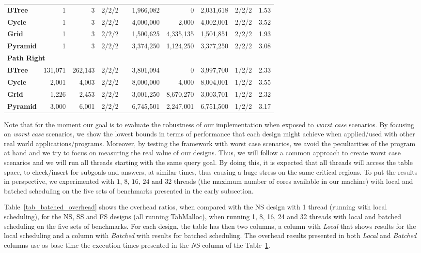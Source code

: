 \documentclass{llncs}
\begin{document}
\begin{table}[ht]
{\begin{tabular}{lrrccrrrcc}
\bf{BTree}    &       1 &       3 & 2/2/2 && 1,966,082 &         0 &
2,031,618 &    2/2/2 &   1.53 \\
\bf{Cycle}    &       1 &       3 & 2/2/2 && 4,000,000 &     2,000 &
4,002,001 &    2/2/2 &   3.52 \\
\bf{Grid}     &       1 &       3 & 2/2/2 && 1,500,625 & 4,335,135 &
1,501,851 &    2/2/2 &  1.93 \\
\bf{Pyramid}  &       1 &       3 & 2/2/2 && 3,374,250 & 1,124,250 &
3,377,250 &    2/2/2 &   3.08 \\
\hline
\multicolumn{10}{l}{\bf Path Right} \\
\bf{BTree}    & 131,071 & 262,143 & 2/2/2 && 3,801,094 &         0 &
3,997,700 &    1/2/2 &  2.33 \\
\bf{Cycle}    &   2,001 &   4,003 & 2/2/2 && 8,000,000 &     4,000 &
8,004,001 &    1/2/2 &  3.55 \\
\bf{Grid}     &   1,226 &   2,453 & 2/2/2 && 3,001,250 & 8,670,270 &
3,003,701 &    1/2/2 &  2.32 \\
\bf{Pyramid}  &   3,000 &   6,001 & 2/2/2 && 6,745,501 & 2,247,001 &
6,751,500 &    1/2/2 &  3.17 \\
\hline\hline
\end{tabular}}
\label{tab_benchs}
\end{table}

Note that for the moment our goal is to evaluate the robustness of our
implementation when exposed to \emph{worst case} scenarios. By
focusing on \emph{worst case} scenarios, we show the lowest bounds in
terms of performance that each design might achieve when applied/used
with other real world applications/programs. Moreover, by testing the
framework with worst case scenarios, we avoid the peculiarities of the
program at hand and we try to focus on measuring the real value of our
designs. Thus, we will follow a common approach to create worst case
scenarios and we will run all threads starting with the same query
goal. By doing this, it is expected that all threads will access the
table space, to check/insert for subgoals and answers, at similar
times, thus causing a huge stress on the same critical regions. To put
the results in perspective, we experimented with $1$, $8$, $16$, $24$
and $32$ threads (the maximum number of cores available in our
machine) with local and batched scheduling on the five sets of
benchmarks presented in the early subsection.

Table~\ref{tab_batched_overhead} shows the overhead ratios, when
compared with the NS design with 1 thread (running with local
scheduling), for the NS, SS and FS designs (all running TabMalloc),
when running 1, 8, 16, 24 and 32 threads with local and batched
scheduling on the five sets of benchmarks. For each design, the table
has then two columns, a column with \emph{Local} that shows results
for the local scheduling and a column with \emph{Batched} with results
for batched scheduling. The overhead results presented in both
\emph{Local} and \emph{Batched} columns use as base time the execution
times presented in the \emph{NS} column of the Table~\ref{tab_benchs}.
\end{document}
